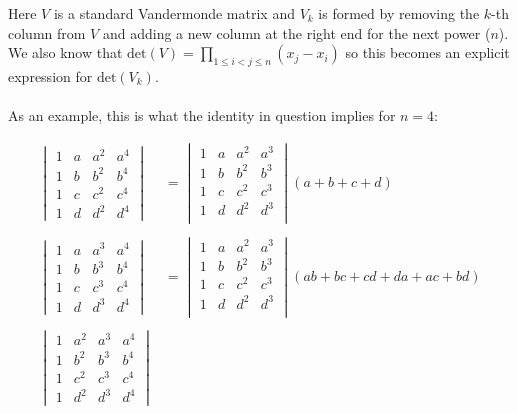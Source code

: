 \documentclass{article}
\begin{document}
Here $V$ is a standard Vandermonde matrix and $V_k$ is formed by removing the $k$-th column from $V$ and adding a new column at the right end for the next power ($n$).\\
We also know that $\textrm{det}(V) = \prod_{1\leq i<j\leq n} (x_j-x_i)$ so this becomes an explicit expression for $\textrm{det}(V_k)$.\\ \\
As an example, this is what the identity in question implies for $n=4$:

\begin{align*}
    \begin{vmatrix}
        1 & a & a^2 & a^4 \\
        1 & b & b^2 & b^4 \\
        1 & c & c^2 & c^4 \\
        1 & d & d^2 & d^4
    \end{vmatrix} &= \begin{vmatrix}
        1 & a & a^2 & a^3\\
        1 & b & b^2 & b^3\\
        1 & c & c^2 & c^3\\
        1 & d & d^2 & d^3\\
    \end{vmatrix} \left(a+b+c+d\right)\\\\
    \begin{vmatrix}
        1 & a & a^3 & a^4 \\
        1 & b & b^3 & b^4 \\
        1 & c & c^3 & c^4 \\
        1 & d & d^3 & d^4
    \end{vmatrix} &= \begin{vmatrix}
        1 & a & a^2 & a^3\\
        1 & b & b^2 & b^3\\
        1 & c & c^2 & c^3\\
        1 & d & d^2 & d^3\\
    \end{vmatrix} \left(ab+bc+cd+da+ac+bd\right)\\\\
    \begin{vmatrix}
        1 & a^2 & a^3 & a^4 \\
        1 & b^2 & b^3 & b^4 \\
        1 & c^2 & c^3 & c^4 \\
        1 & d^2 & d^3 & d^4

\end{vmatrix}
\end{align*}
\end{document}
